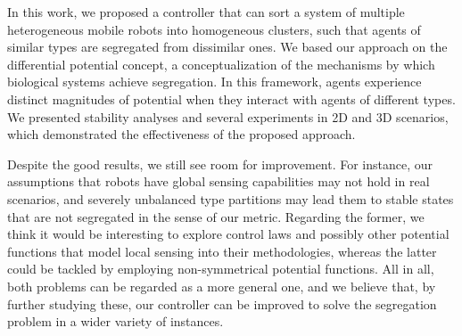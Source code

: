 \documentclass[letterpaper, 10 pt, conference]{ieeeconf}  %
\begin{document}
In this work, we proposed a controller that can sort a system of
multiple heterogeneous mobile robots into homogeneous clusters, such
that agents of similar types are segregated from dissimilar ones. We
based our approach on the differential potential concept, a
conceptualization of the mechanisms by which biological systems
achieve segregation. In this framework, agents experience distinct
magnitudes of potential when they interact with agents of different
types. We presented stability analyses and several experiments in 2D
and 3D scenarios, which demonstrated the effectiveness of the proposed
approach.

Despite the good results, we still see room for improvement. For
instance, our assumptions that robots have global sensing capabilities
may not hold in real scenarios, and severely unbalanced type
partitions may lead them to stable states that are not segregated in
the sense of our metric. Regarding the former, we think it would be
interesting to explore control laws and possibly other potential
functions that model local sensing into their methodologies, whereas
the latter could be tackled by employing non-symmetrical potential
functions. All in all, both problems can be regarded as a more general
one, and we believe that, by further studying these, our controller
can be improved to solve the segregation problem in a wider variety of
instances.














\end{document}
